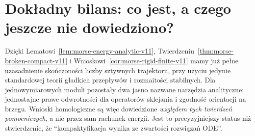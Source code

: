 \section{Dokładny bilans: co jest, a czego jeszcze nie dowiedziono?}
Dzięki Lematowi~\ref{lem:morse-energy-analytic-v11},
Twierdzeniu~\ref{thm:morse-broken-compact-v11} i
Wnioskowi~\ref{cor:morse-rigid-finite-v11} mamy już
pełne uzasadnienie skończoności liczby sztywnych trajektorii,
przy użyciu jedynie standardowej teorii gładkich przepływów
i rozmaitości stabilnych. Dla jednowymiarowych moduli
pozostały dwa jasno nazwane narzędzia analityczne:
jednostajne prawe odwrotności dla operatorów sklejania i
zgodność orientacji na brzegu. Wnioski homologiczne są
więc dowiedzione \emph{względem tych twierdzeń pomocniczych},
a nie przez sam rachunek energii. Jest to precyzyjniejszy
status niż stwierdzenie, że ``kompaktyfikacja wynika
ze zwartości rozwiązań ODE''.



